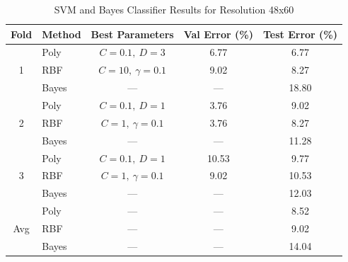 \documentclass[12pt, letterpaper]{article}
\begin{document}
\begin{table}[htbp]
	\centering
	\caption{SVM and Bayes Classifier Results for Resolution 48x60}
	\begin{tabular}{clccc}
		\toprule
		\textbf{Fold} & \textbf{Method} & \textbf{Best Parameters} & \textbf{Val Error (\%)} & \textbf{Test Error (\%)} \\
		\midrule
		\multirow{3}{*}{1}
		              & Poly            & $C=0.1,\ D=3$            & 6.77                    & 6.77                     \\
		              & RBF             & $C=10,\ \gamma=0.1$      & 9.02                    & 8.27                     \\
		              & Bayes           & ---                      & ---                     & 18.80                    \\
		\midrule
		\multirow{3}{*}{2}
		              & Poly            & $C=0.1,\ D=1$            & 3.76                    & 9.02                     \\
		              & RBF             & $C=1,\ \gamma=0.1$       & 3.76                    & 8.27                     \\
		              & Bayes           & ---                      & ---                     & 11.28                    \\
		\midrule
		\multirow{3}{*}{3}
		              & Poly            & $C=0.1,\ D=1$            & 10.53                   & 9.77                     \\
		              & RBF             & $C=1,\ \gamma=0.1$       & 9.02                    & 10.53                    \\
		              & Bayes           & ---                      & ---                     & 12.03                    \\
		\midrule
		\multirow{3}{*}{Avg}
		              & Poly            & ---                      & ---                     & 8.52                     \\
		              & RBF             & ---                      & ---                     & 9.02                     \\
		              & Bayes           & ---                      & ---                     & 14.04                    \\
		\bottomrule
	\end{tabular}
	\label{tab:svm_bayes_48x60}
\end{table}
\end{document}
